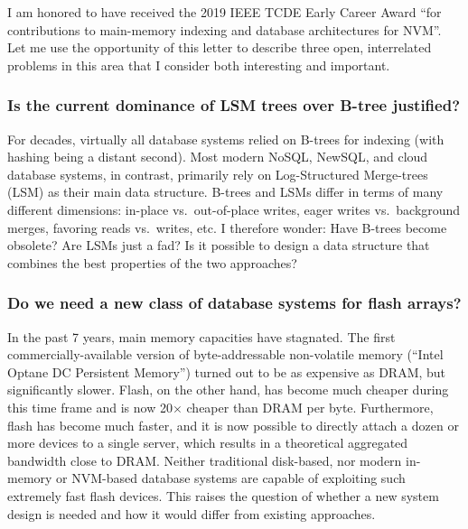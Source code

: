 \documentclass[11pt]{article}
\begin{document}

I am honored to have received the 2019 IEEE TCDE Early Career Award ``for contributions to main-memory indexing and database architectures for NVM''.
Let me use the opportunity of this letter to describe three open, interrelated problems in this area that I consider both interesting and important.

\subsubsection*{Is the current dominance of LSM trees over B-tree justified?}

For decades, virtually all database systems relied on B-trees for indexing (with hashing being a distant second).
Most modern NoSQL, NewSQL, and cloud database systems, in contrast, primarily rely on Log-Structured Merge-trees (LSM) as their main data structure.
B-trees and LSMs differ in terms of many different dimensions: in-place vs.~out-of-place writes, eager writes vs.~background merges, favoring reads vs.~writes, etc.
I therefore wonder: Have B-trees become obsolete? Are LSMs just a fad? Is it possible to design a data structure that combines the best properties of the two approaches?

\subsubsection*{Do we need a new class of database systems for flash arrays?}

In the past 7 years, main memory capacities have stagnated.
The first commercially-available version of byte-addressable non-volatile memory (``Intel Optane DC Persistent Memory'') turned out to be as expensive as DRAM, but significantly slower.
Flash, on the other hand, has become much cheaper during this time frame and is now 20$\times$ cheaper than DRAM per byte.
Furthermore, flash has become much faster, and it is now possible to directly attach a dozen or more devices to a single server, which results in a theoretical aggregated bandwidth close to DRAM.
Neither traditional disk-based, nor modern in-memory or NVM-based database systems are capable of exploiting such extremely fast flash devices.
This raises the question of whether a new system design is needed and how it would differ from existing approaches.
\end{document}
